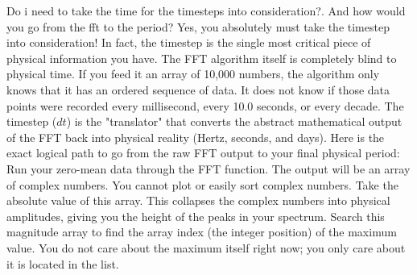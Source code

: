 {}\markdownRendererThematicBreak{}\markdownRendererInterblockSeparator
{}
\markdownRendererSectionEnd 
\markdownRendererSectionEnd \markdownRendererSectionBegin
{}\markdownRendererInterblockSeparator
{}Do i need to take the time for the timesteps into consideration?. And how would you go from the fft to the period?\markdownRendererInterblockSeparator
{}
\markdownRendererSectionEnd \markdownRendererSectionBegin
{}\markdownRendererInterblockSeparator
{}Yes, you absolutely must take the timestep into consideration! In fact, the timestep is the single most critical piece of physical information you have.\markdownRendererInterblockSeparator
{}The FFT algorithm itself is completely blind to physical time. If you feed it an array of 10,000 numbers, the algorithm only knows that it has an ordered sequence of data. It does not know if those data points were recorded every millisecond, every 10.0 seconds, or every decade.\markdownRendererInterblockSeparator
{}The timestep ($dt$) is the "translator" that converts the abstract mathematical output of the FFT back into physical reality (Hertz, seconds, and days).\markdownRendererInterblockSeparator
{}Here is the exact logical path to go from the raw FFT output to your final physical period:\markdownRendererInterblockSeparator
{}\markdownRendererSectionBegin
{}\markdownRendererInterblockSeparator
{}\markdownRendererOlBegin
{} Run your zero-mean data through the FFT function. The output will be an array of complex numbers.\markdownRendererOlItemEnd 
{} You cannot plot or easily sort complex numbers. Take the absolute value of this array. This collapses the complex numbers into physical amplitudes, giving you the height of the peaks in your spectrum.\markdownRendererOlItemEnd 
{} Search this magnitude array to find the array index (the integer position) of the maximum value. You do not care about the maximum  itself right now; you only care about  it is located in the list.\markdownRendererOlItemEnd 
\markdownRendererOlEnd \markdownRendererInterblockSeparator
{}
\markdownRendererSectionEnd \markdownRendererSectionBegin
{}\markdownRendererInterblockSeparator
